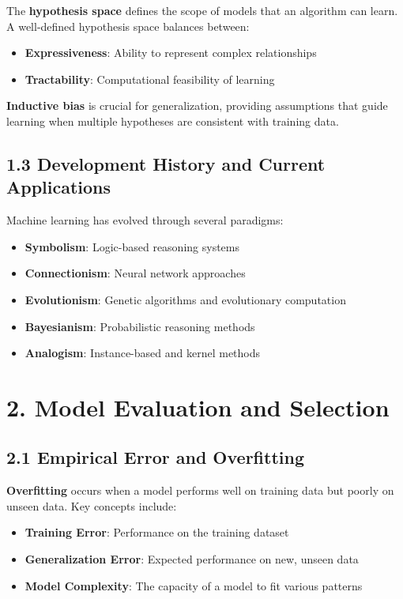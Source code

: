 \documentclass{amsart}
\theoremstyle{plain}
\theoremstyle{definition}
\theoremstyle{remark}
\begin{document}
The \textbf{hypothesis space} defines the scope of models that an algorithm can learn. A well-defined hypothesis space balances between:

\begin{itemize}
	\item \textbf{Expressiveness}: Ability to represent complex relationships
	\item \textbf{Tractability}: Computational feasibility of learning
\end{itemize}

\textbf{Inductive bias} is crucial for generalization, providing assumptions that guide learning when multiple hypotheses are consistent with training data.

\subsection{1.3 Development History and Current Applications}

Machine learning has evolved through several paradigms:

\begin{itemize}
	\item \textbf{Symbolism}: Logic-based reasoning systems
	\item \textbf{Connectionism}: Neural network approaches
	\item \textbf{Evolutionism}: Genetic algorithms and evolutionary computation
	\item \textbf{Bayesianism}: Probabilistic reasoning methods
	\item \textbf{Analogism}: Instance-based and kernel methods
\end{itemize}

\section{2. Model Evaluation and Selection}

\subsection{2.1 Empirical Error and Overfitting}

\textbf{Overfitting} occurs when a model performs well on training data but poorly on unseen data. Key concepts include:

\begin{itemize}
	\item \textbf{Training Error}: Performance on the training dataset
	\item \textbf{Generalization Error}: Expected performance on new, unseen data
	\item \textbf{Model Complexity}: The capacity of a model to fit various patterns
\end{itemize}
\end{document}
